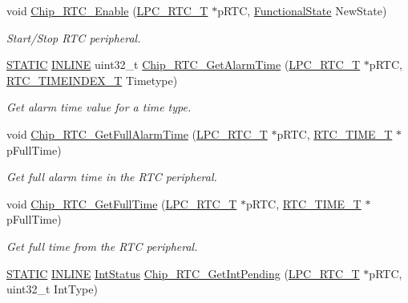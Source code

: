 \begin{DoxyCompactItemize}
void \hyperlink{group__RTC__17XX__40XX_gaad05032c6d6c4bc5ea9e02311cdc9a18}{Chip\+\_\+\+R\+T\+C\+\_\+\+Enable} (\hyperlink{structLPC__RTC__T}{L\+P\+C\+\_\+\+R\+T\+C\+\_\+T} $\ast$p\+R\+TC, \hyperlink{group__LPC__Types__Public__Types_gac9a7e9a35d2513ec15c3b537aaa4fba1}{Functional\+State} New\+State)
\begin{DoxyCompactList}\small\item\em Start/\+Stop R\+TC peripheral. \end{DoxyCompactList}\item 
\hyperlink{group__LPC__Types__Public__Macros_ga10b2d890d871e1489bb02b7e70d9bdfb}{S\+T\+A\+T\+IC} \hyperlink{group__LPC__Types__Public__Types_ga2eb6f9e0395b47b8d5e3eeae4fe0c116}{I\+N\+L\+I\+NE} uint32\+\_\+t \hyperlink{group__RTC__17XX__40XX_gaf094ef7c4ff7295c74be8ab77e39a967}{Chip\+\_\+\+R\+T\+C\+\_\+\+Get\+Alarm\+Time} (\hyperlink{structLPC__RTC__T}{L\+P\+C\+\_\+\+R\+T\+C\+\_\+T} $\ast$p\+R\+TC, \hyperlink{group__RTC__17XX__40XX_ga8144898fe628404d396db06dc8aac0e0}{R\+T\+C\+\_\+\+T\+I\+M\+E\+I\+N\+D\+E\+X\+\_\+T} Timetype)
\begin{DoxyCompactList}\small\item\em Get alarm time value for a time type. \end{DoxyCompactList}\item 
void \hyperlink{group__RTC__17XX__40XX_ga21b9a7c640870482b47deda15ff0a01b}{Chip\+\_\+\+R\+T\+C\+\_\+\+Get\+Full\+Alarm\+Time} (\hyperlink{structLPC__RTC__T}{L\+P\+C\+\_\+\+R\+T\+C\+\_\+T} $\ast$p\+R\+TC, \hyperlink{structRTC__TIME__T}{R\+T\+C\+\_\+\+T\+I\+M\+E\+\_\+T} $\ast$p\+Full\+Time)
\begin{DoxyCompactList}\small\item\em Get full alarm time in the R\+TC peripheral. \end{DoxyCompactList}\item 
void \hyperlink{group__RTC__17XX__40XX_gab03d971e0b77ba907f414cdc00acce3b}{Chip\+\_\+\+R\+T\+C\+\_\+\+Get\+Full\+Time} (\hyperlink{structLPC__RTC__T}{L\+P\+C\+\_\+\+R\+T\+C\+\_\+T} $\ast$p\+R\+TC, \hyperlink{structRTC__TIME__T}{R\+T\+C\+\_\+\+T\+I\+M\+E\+\_\+T} $\ast$p\+Full\+Time)
\begin{DoxyCompactList}\small\item\em Get full time from the R\+TC peripheral. \end{DoxyCompactList}\item 
\hyperlink{group__LPC__Types__Public__Macros_ga10b2d890d871e1489bb02b7e70d9bdfb}{S\+T\+A\+T\+IC} \hyperlink{group__LPC__Types__Public__Types_ga2eb6f9e0395b47b8d5e3eeae4fe0c116}{I\+N\+L\+I\+NE} \hyperlink{group__LPC__Types__Public__Types_gab7d263072f745b4f3913fb0afc434c4e}{Int\+Status} \hyperlink{group__RTC__17XX__40XX_gaab21524984ac344d4f508d2dfd6c5098}{Chip\+\_\+\+R\+T\+C\+\_\+\+Get\+Int\+Pending} (\hyperlink{structLPC__RTC__T}{L\+P\+C\+\_\+\+R\+T\+C\+\_\+T} $\ast$p\+R\+TC, uint32\+\_\+t Int\+Type)

\end{DoxyCompactItemize}

